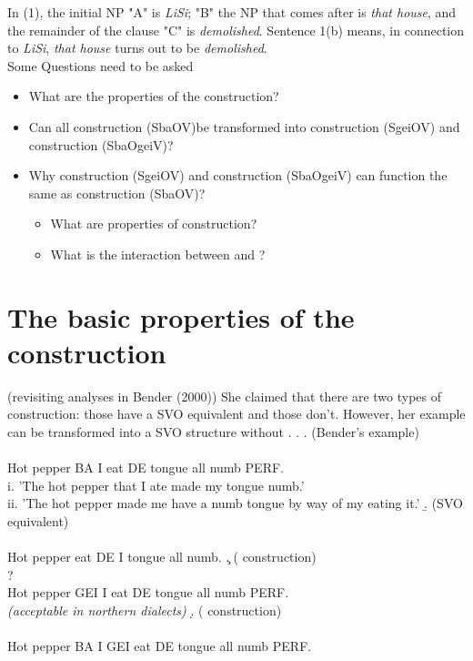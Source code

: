 \documentclass[12pt, oneside]{article}
\begin{document}
In (1), the initial NP "A" is \textit{LiSi}; "B" the NP that comes after  is  \textit{that house}, and the remainder of the clause "C" is \textit{demolished}. Sentence 1(b) means, in connection to \textit{LiSi}, \textit{that house} turns out to be \textit{demolished}.
\\
\newline
Some Questions need to be asked
   \begin{itemize}[noitemsep]
         \item What are the properties of the  construction?
         \item Can all  construction (SbaOV)be transformed into  construction (SgeiOV) and  construction (SbaOgeiV)?
         \item Why  construction (SgeiOV) and  construction (SbaOgeiV) can function the same as  construction (SbaOV)?
            \begin{itemize}[noitemsep]
                 \item What are properties of  construction?
                 \item What is the interaction between  and ?  
          \end{itemize}
    \end{itemize}
\section{The basic properties of the  construction}
(revisiting analyses in Bender (2000))
\newline
She claimed that there are two types of  construction: those have a SVO equivalent and those don't. However, her example can be transformed into a SVO structure without .  
\ex. \a. (Bender's example)\\
    \\
    Hot pepper BA I eat DE tongue all numb PERF.\\
    i. 'The hot pepper that I ate made my tongue numb.'\\
    ii. 'The hot pepper made me have a numb tongue by way of my eating it.'
    \b. (SVO equivalent)\\
    \\
    Hot pepper eat DE I tongue all numb. 
    \c. ( construction)\\
    ? \\
    Hot pepper GEI I eat DE tongue all numb PERF.\\
    \textit{(acceptable in northern dialects)}
    \d. ( construction)\\
    \\
    Hot pepper BA I GEI eat DE tongue all numb PERF.\\
 
\end{document}
